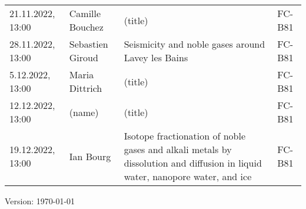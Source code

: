 \documentclass[12pt]{article}
\begin{document}
\begin{tabular}{l p{3.8cm} p{8.5cm} p{2cm}}
21.11.2022, 13:00
 	& Camille Bouchez
 	& (title)
 	& FC-B81\\

28.11.2022, 13:00
 	& Sebastien Giroud
 	& Seismicity and noble gases around Lavey les Bains
 	& FC-B81\\

5.12.2022, 13:00
 	& Maria Dittrich
 	& (title)
 	& FC-B81\\

12.12.2022, 13:00
 	& (name)
 	& (title)
 	& FC-B81\\

19.12.2022, 13:00
 	& Ian Bourg
 	& Isotope fractionation of noble gases and alkali metals by dissolution and diffusion in liquid water, nanopore water, and ice
 	& FC-B81\\


\end{tabular}

\vfill

{\scriptsize Version: \today}
\end{document}

